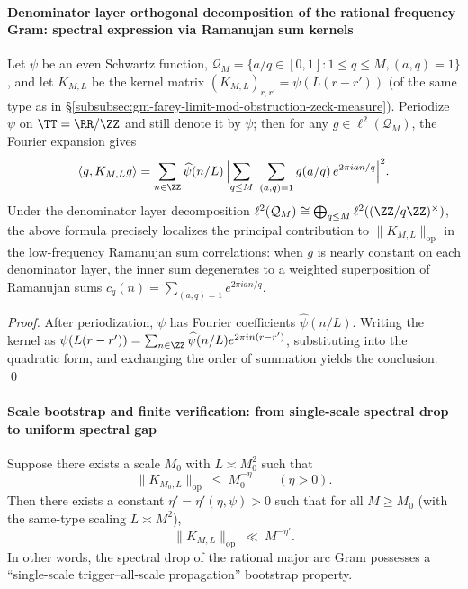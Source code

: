 \begin{proposition}
\paragraph{Denominator layer orthogonal decomposition of the rational frequency Gram: spectral expression via Ramanujan sum kernels}
\begin{proposition}\label{prop:gm-ramanujan-layer-decomposition}
Let \(\psi\) be an even Schwartz function, \(\mathcal{Q}_M=\{a/q\in[0,1]:1\le q\le M,(a,q)=1\}\), and let
\(
K_{M,L}
\)
be the kernel matrix
\(
(K_{M,L})_{r,r'}=\psi(L(r-r'))
\)
(of the same type as in \S\ref{subsubsec:gm-farey-limit-mod-obstruction-zeck-measure}).
Periodize \(\psi\) on \(\TT=\RR/\ZZ\) and still denote it by \(\psi\); then for any \(g\in\ell^2(\mathcal{Q}_M)\), the Fourier expansion gives
\[
\langle g,K_{M,L}g\rangle
=\sum_{n\in\ZZ}\widehat\psi(n/L)\,
\Bigl|\sum_{q\le M}\ \sum_{(a,q)=1} g(a/q)\,e^{2\pi i an/q}\Bigr|^2.
\]
Under the denominator layer decomposition \(\ell^2(\mathcal{Q}_M)\cong\bigoplus_{q\le M}\ell^2((\ZZ/q\ZZ)^\times)\), the above formula precisely localizes the principal contribution to \(\|K_{M,L}\|_{\mathrm{op}}\) in the low-frequency Ramanujan sum correlations: when \(g\) is nearly constant on each denominator layer, the inner sum degenerates to a weighted superposition of Ramanujan sums
\(
c_q(n)=\sum_{(a,q)=1}e^{2\pi i an/q}
\).
\end{proposition}

\begin{proof}
After periodization, \(\psi\) has Fourier coefficients \(\widehat\psi(n/L)\).
Writing the kernel as \(\psi(L(r-r'))=\sum_{n\in\ZZ}\widehat\psi(n/L)e^{2\pi i n(r-r')}\), substituting into the quadratic form, and exchanging the order of summation yields the conclusion. \qed
\end{proof}

\paragraph{Scale bootstrap and finite verification: from single-scale spectral drop to uniform spectral gap}
\begin{proposition}\label{prop:gm-scale-bootstrap-gram}
Suppose there exists a scale \(M_0\) with \(L\asymp M_0^2\) such that
\[
\|K_{M_0,L}\|_{\mathrm{op}}\ \le\ M_0^{-\eta}
\qquad(\eta>0).
\]
Then there exists a constant \(\eta'=\eta'(\eta,\psi)>0\) such that for all \(M\ge M_0\) (with the same-type scaling \(L\asymp M^2\)),
\[
\|K_{M,L}\|_{\mathrm{op}}\ \ll\ M^{-\eta'}.
\]
In other words, the spectral drop of the rational major arc Gram possesses a ``single-scale trigger--all-scale propagation'' bootstrap property.
\end{proposition}


\end{proposition}
